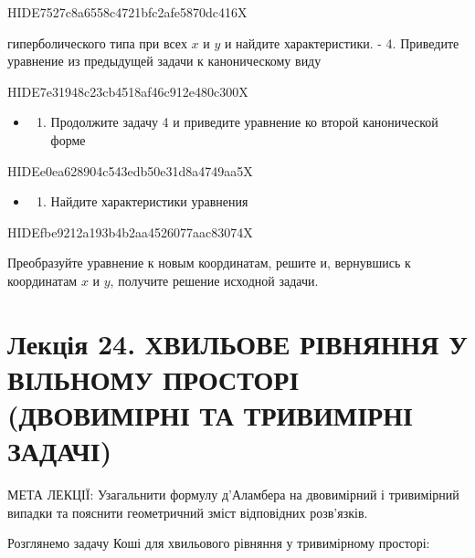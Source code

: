 \documentclass[
  ukrainian,
]{article}
\providecommand{\tightlist}{%
  \setlength{\itemsep}{0pt}\setlength{\parskip}{0pt}}
\begin{document}
HIDE7527c8a6558c4721bfc2afe5870dc416X

гиперболического типа при всех \(x\) и \(y\) и найдите характеристики. -
4. Приведите уравнение из предыдущей задачи к каноническому виду

HIDE7e31948c23cb4518af46c912e480c300X

\begin{itemize}
\tightlist
\item
  \begin{enumerate}
  \def\labelenumi{\arabic{enumi}.}
  \setcounter{enumi}{4}
  \tightlist
  \item
    Продолжите задачу 4 и приведите уравнение ко второй канонической
    форме
  \end{enumerate}
\end{itemize}

HIDEe0ea628904c543edb50e31d8a4749aa5X

\begin{itemize}
\tightlist
\item
  \begin{enumerate}
  \def\labelenumi{\arabic{enumi}.}
  \setcounter{enumi}{5}
  \tightlist
  \item
    Найдите характеристики уравнения
  \end{enumerate}
\end{itemize}

HIDEfbe9212a193b4b2aa4526077aac83074X

Преобразуйте уравнение к новым координатам, решите и, вернувшись к
координатам \(x\) и \(y\), получите решение исходной задачи.

\section{Лекція 24. ХВИЛЬОВЕ РІВНЯННЯ У ВІЛЬНОМУ ПРОСТОРІ (ДВОВИМІРНІ ТА
ТРИВИМІРНІ
ЗАДАЧІ)}\label{ux43bux435ux43aux446ux456ux44f-24.-ux445ux432ux438ux43bux44cux43eux432ux435-ux440ux456ux432ux43dux44fux43dux43dux44f-ux443-ux432ux456ux43bux44cux43dux43eux43cux443-ux43fux440ux43eux441ux442ux43eux440ux456-ux434ux432ux43eux432ux438ux43cux456ux440ux43dux456-ux442ux430-ux442ux440ux438ux432ux438ux43cux456ux440ux43dux456-ux437ux430ux434ux430ux447ux456}

МЕТА ЛЕКЦІЇ: Узагальнити формулу д'Аламбера на двовимірний і тривимірний
випадки та пояснити геометричний зміст відповідних розв'язків.

Розглянемо задачу Коші для хвильового рівняння у тривимірному просторі:
\end{document}
